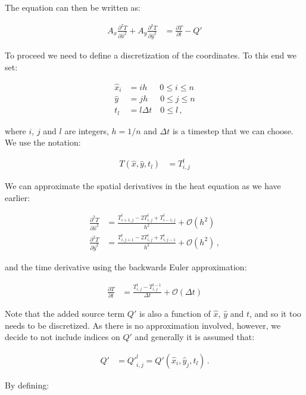 \documentclass[reprint,english,notitlepage]{revtex4-1}  %
\begin{document}
The equation can then be written as:

\begin{align*}
A_x \frac{\partial^2 T}{\partial \hat{x}^2} + A_y \frac{\partial^2 T}{\partial \hat{y}^2} &=  \frac{\partial T}{\partial t} - Q'
\end{align*}

To proceed we need to define a discretization of the coordinates. To this end we set:

\begin{align*}
\hat{x}_i &= i h \quad \,\,\, 0 \leq i \leq n \\
\hat{y} &= j h \quad \,\,\, 0 \leq j \leq n \\
t_l &= l \Delta t \quad 0 \leq l \, ,
\end{align*}

where $i$, $j$ and $l$ are integers, $h = 1/n$ and $\Delta t$ is a timestep that we can choose. We use the notation:

\begin{align*}
T(\hat{x},\hat{y},t_l) &= T_{i,j}^l 
\end{align*}

We can approximate the spatial derivatives in the heat equation as we have earlier:

\begin{align*}
\frac{\partial^2 T}{\partial \hat{x}^2} &= \frac{T_{i+1,j}^l - 2 T_{i,j}^l + T_{i-1,j}^l}{h^2} + \mathcal{O}(h^2) \\
\frac{\partial^2 T}{\partial \hat{y}^2} &= \frac{T_{i,j+1}^l - 2 T_{i,j}^l + T_{i,j-1}^l}{h^2} + \mathcal{O}(h^2) \, ,
\end{align*}

and the time derivative using the backwards Euler approximation:

\begin{align*}
\frac{\partial T}{\partial t} &= \frac{T_{i,j}^l - T_{i,j}^{l-1}}{\Delta t} + \mathcal{O}(\Delta t)
\end{align*}

Note that the added source term $Q'$ is also a function of $\hat{x}$, $\hat{y}$ and $t$, and so it too needs to be discretized. As there is no approximation involved, however, we decide to not include indices on $Q'$ and generally it is assumed that:

\begin{align*}
Q' &= {Q'}_{i,j}^l = Q'(\hat{x}_i,\hat{y}_j,t_l) \, .
\end{align*} 

By defining:
\end{document}

